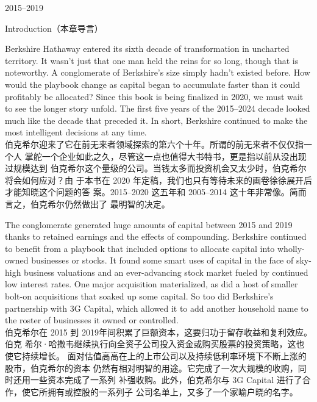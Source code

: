 \begin{chapter}{2015--2019}
\begin{section}{Introduction（本章导言）}
\begin{verseparallel}
  {
    Berkshire Hathaway entered its sixth decade of transformation in uncharted
    territory. It wasn't just that one man held the reins for so long, though
    that is noteworthy. A conglomerate of Berkshire's size simply hadn't
    existed before. How would the playbook change as capital began to accumulate
    faster than it could profitably be allocated? Since this book is being
    finalized in 2020, we must wait to see the longer story unfold. The first
    five years of the 2015–2024 decade looked much like the decade that preceded
    it. In short, Berkshire continued to make the most intelligent decisions at
    any time. \\
  }
  {
    伯克希尔迎来了它在前无来者领域探索的第六个十年。所谓的前无来者不仅仅指一个人
    掌舵一个企业如此之久，尽管这一点也值得大书特书，更是指以前从没出现过规模达到
    伯克希尔这个量级的公司。当钱太多而投资机会又太少时，伯克希尔将会如何应对？由
    于本书在 2020 年定稿，我们也只有等待未来的画卷徐徐展开后才能知晓这个问题的答
    案。2015--2020 这五年和 2005--2014 这十年非常像。简而言之，伯克希尔仍然做出了
    最明智的决定。
  }
\end{verseparallel}

\begin{verseparallel}
  {
    The conglomerate generated huge amounts of capital between 2015 and
    2019 thanks to retained earnings and the effects of compounding. Berkshire
    continued to benefit from a playbook that included options to allocate
    capital into wholly-owned businesses or stocks. It found some smart uses of
    capital in the face of sky-high business valuations and an ever-advancing
    stock market fueled by continued low interest rates. One major acquisition
    materialized, as did a host of smaller bolt-on acquisitions that soaked up
    some capital. So too did Berkshire's partnership with 3G Capital, which
    allowed it to add another household name to the roster of businesses it
    owned or controlled.\\
  }
  {
    伯克希尔在 2015 到 2019年间积累了巨额资本，这要归功于留存收益和复利效应。伯克
    希尔·哈撒韦继续执行向全资子公司投入资金或购买股票的投资策略，这也使它持续增长。
    面对估值高高在上的上市公司以及持续低利率环境下不断上涨的股市，伯克希尔的资本
    仍然有相对明智的用途。它完成了一次大规模的收购，同时还用一些资本完成了一系列
    补强收购。此外，伯克希尔与 3G Capital 进行了合作，使它所拥有或控股的一系列子
    公司名单上，又多了一个家喻户晓的名字。
  }
\end{verseparallel}


\end{section}
\end{chapter}
